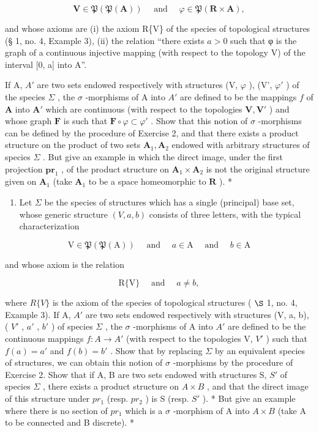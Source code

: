 \[
\mathbf {V} \in \mathfrak {P} (\mathfrak {P} (\mathbf {A})) \quad \text { and } \quad \varphi \in \mathfrak {P} (\mathbf {R} \times \mathbf {A}),
\]

and whose axioms are (i) the axiom R\{V\} of the species of topological structures (§ 1, no. 4, Example 3), (ii) the relation ``there exists \(a>0\) such that φ is the graph of a continuous injective mapping (with respect to the topology V) of the interval {[}0, a{]} into A''.

If A, \(A'\) are two sets endowed respectively with structures (V, \(\varphi\) ), (V', \(\varphi'\) ) of the species \(\Sigma\) , the \(\sigma\) -morphisms of A into \(A'\) are defined to be the mappings \(f\) of \(\mathbf{A}\) into \(\mathbf{A}'\) which are continuous (with respect to the topologies \(\mathbf{V}, \mathbf{V}'\) ) and whose graph \(\mathbf{F}\) is such that \(\mathbf{F} \circ \varphi \subset \varphi'\) . Show that this notion of \(\sigma\) -morphisms can be defined by the procedure of Exercise 2, and that there exists a product structure on the product of two sets \(\mathbf{A}_1, \mathbf{A}_2\) endowed with arbitrary structures of species \(\Sigma\) . But give an example in which the direct image, under the first projection \(\mathbf{pr}_1\) , of the product structure on \(\mathbf{A}_1 \times \mathbf{A}_2\) is not the original structure given on \(\mathbf{A}_1\) (take \(\mathbf{A}_1\) to be a space homeomorphic to \(\mathbf{R}\) ). *

\begin{enumerate}
\def\labelenumi{\arabic{enumi}.}
\setcounter{enumi}{7}
\tightlist
\item
  Let \(\Sigma\) be the species of structures which has a single (principal) base set, whose generic structure \((V, a, b)\) consists of three letters, with the typical characterization
\end{enumerate}

\[
\mathrm{V} \in \mathfrak {P} (\mathfrak {P} (\mathrm{A})) \quad \text { and } \quad a \in \mathrm{A} \quad \text { and } \quad b \in \mathrm{A}
\]

and whose axiom is the relation

\[
\mathrm{R} \{\mathrm{V} \} \quad \text { and } \quad a \neq b,
\]

where \(R\{V\}\) is the axiom of the species of topological structures ( \(\S\) 1, no. 4, Example 3). If A, \(A'\) are two sets endowed respectively with structures (V, a, b), ( \(V'\) , \(a'\) , \(b'\) ) of species \(\Sigma\) , the \(\sigma\) -morphisms of A into \(A'\) are defined to be the continuous mappings \(f: A \to A'\) (with respect to the topologies V, \(V'\) ) such that \(f(a) = a'\) and \(f(b) = b'\) . Show that by replacing \(\Sigma\) by an equivalent species of structures, we can obtain this notion of \(\sigma\) -morphisms by the procedure of Exercise 2. Show that if A, B are two sets endowed with structures S, \(S'\) of species \(\Sigma\) , there exists a product structure on \(A \times B\) , and that the direct image of this structure under \(pr_{1}\) (resp. \(pr_{2}\) ) is S (resp. \(S'\) ). * But give an example where there is no section of \(pr_{1}\) which is a \(\sigma\) -morphism of A into \(A \times B\) (take A to be connected and B discrete). *

